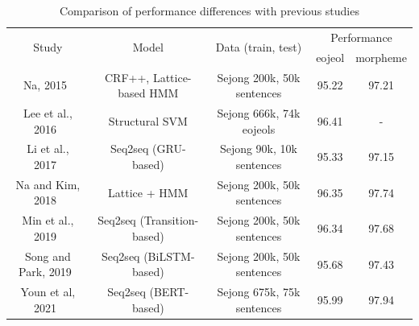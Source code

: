 \documentclass[AMS,STIX2COL]{WileyNJD-v2}
\begin{document}
    \begin{table}[]
        \caption{Comparison of performance differences with previous studies}
        \label{tab:differences-with-previous-studies}
        \begin{tabular*}{500pt}{@{\extracolsep\fill}ccc|cc@{\extracolsep\fill}}
            \toprule
            \multirow{2}{*}{Study}                & \multirow{2}{*}{Model}                          & \multirow{2}{*}{Data (train, test)}         & \multicolumn{2}{c}{Performance}                           \\
            \cmidrule{4-5}
            ~                                     & ~                                               & ~                                           & \multicolumn{1}{c}{eojeol} & \multicolumn{1}{c}{morpheme} \\
            \midrule
            Na, 2015~\cite{NaSH2015}              & CRF++, Lattice-based HMM                        & Sejong 200k, 50k sentences                  & 95.22                      & 97.21                        \\
            Lee et al., 2016~\cite{LeeCH2016}     & Structural SVM                                  & Sejong 666k, 74k eojeols                    & 96.41                      & -                            \\
            Li et al., 2017~\cite{Li2017}         & Seq2seq (GRU-based)                             & Sejong 90k, 10k sentences                   & 95.33                      & 97.15                        \\
            Na and Kim, 2018~\cite{NaSH2018}      & Lattice + HMM                                   & Sejong 200k, 50k sentences                  & 96.35                      & 97.74                        \\
            Min et al., 2019~\cite{MinJW2019}     & Seq2seq (Transition-based)                      & Sejong 200k, 50k sentences                  & 96.34                      & 97.68                        \\
            Song and Park, 2019~\cite{SongHJ2019} & Seq2seq (BiLSTM-based)                          & Sejong 200k, 50k sentences                  & 95.68                      & 97.43                        \\
            Youn et al, 2021~\cite{YounJY2021}    & Seq2seq (BERT-based)                            & Sejong 675k, 75k sentences                  & 95.99                      & 97.94                        \\

\end{tabular*}
\end{table}
\end{document}
